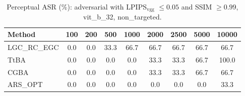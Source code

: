 \begin{table}[t]
\centering\footnotesize
\caption{Perceptual ASR (\%): adversarial with LPIPS$_{\mathrm{vgg}}$ $\le 0.05$ and SSIM $\ge 0.99$, vit\_b\_32, non\_targeted.}
\begin{tabular}{lcccccccc}
\toprule
Method & 100 & 200 & 500 & 1000 & 2000 & 2500 & 5000 & 10000 \\
\midrule
LGC\_RC\_EGC & 0.0 & 0.0 & 33.3 & 66.7 & 66.7 & 66.7 & 66.7 & 66.7 \\
TtBA & 0.0 & 0.0 & 0.0 & 0.0 & 33.3 & 33.3 & 66.7 & 100.0 \\
CGBA & 0.0 & 0.0 & 0.0 & 0.0 & 33.3 & 33.3 & 66.7 & 66.7 \\
ARS\_OPT & 0.0 & 0.0 & 0.0 & 0.0 & 0.0 & 0.0 & 0.0 & 33.3 \\
\bottomrule
\end{tabular}
\end{table}
